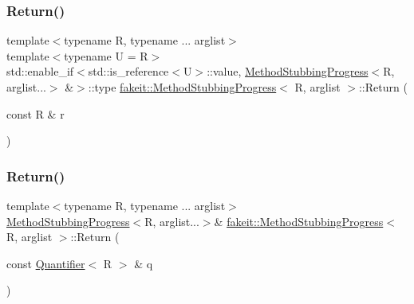 \mbox{\label{structfakeit_1_1MethodStubbingProgress_ab20141c6f552c3aa3399660c520c2ba4}} 
\subsubsection{\texorpdfstring{Return()}{Return()}\hspace{0.1cm}{\footnotesize\ttfamily [2/45]}}
{\footnotesize\ttfamily template$<$typename R, typename ... arglist$>$ \\
template$<$typename U  = R$>$ \\
std\+::enable\+\_\+if$<$std\+::is\+\_\+reference$<$U$>$\+::value, \mbox{\hyperlink{structfakeit_1_1MethodStubbingProgress}{Method\+Stubbing\+Progress}}$<$R, arglist...$>$ \&$>$\+::type \mbox{\hyperlink{structfakeit_1_1MethodStubbingProgress}{fakeit\+::\+Method\+Stubbing\+Progress}}$<$ R, arglist $>$\+::Return (\begin{DoxyParamCaption}\item[{const R \&}]{r }\end{DoxyParamCaption})\hspace{0.3cm}{\ttfamily [inline]}}

\mbox{\label{structfakeit_1_1MethodStubbingProgress_acb4d4db8208a8eaadff77e7cbf3775db}} 
\subsubsection{\texorpdfstring{Return()}{Return()}\hspace{0.1cm}{\footnotesize\ttfamily [3/45]}}
{\footnotesize\ttfamily template$<$typename R, typename ... arglist$>$ \\
\mbox{\hyperlink{structfakeit_1_1MethodStubbingProgress}{Method\+Stubbing\+Progress}}$<$R, arglist...$>$\& \mbox{\hyperlink{structfakeit_1_1MethodStubbingProgress}{fakeit\+::\+Method\+Stubbing\+Progress}}$<$ R, arglist $>$\+::Return (\begin{DoxyParamCaption}\item[{const \mbox{\hyperlink{structfakeit_1_1Quantifier}{Quantifier}}$<$ R $>$ \&}]{q }\end{DoxyParamCaption})\hspace{0.3cm}{\ttfamily [inline]}}


